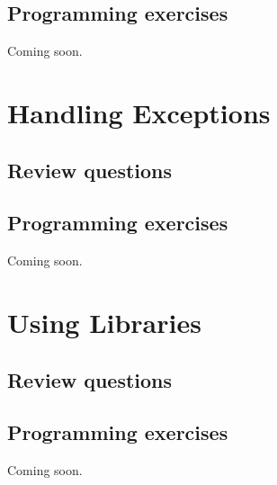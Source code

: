 \documentclass[article,A4,12pt]{llncs}
\begin{document}
\subsection{Programming exercises}

Coming soon.


\section{Handling Exceptions}

\subsection{Review questions}

\subsection{Programming exercises}

Coming soon.


\section{Using Libraries}

\subsection{Review questions}

\subsection{Programming exercises}

Coming soon.
\end{document}
